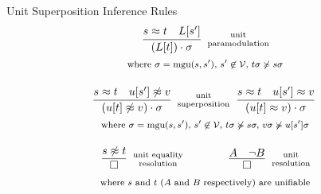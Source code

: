 
     \begin{exampleblock}{Unit Superposition Inference Rules}
\begin{gather*}
	\infer
	[\TOPTEXT{unit}{paramodulation}]
	{(L[t])\cdot\sigma}
	{s\foEQ t&L[s']}
\\\text{\footnotesize 
where $\sigma=\mgu(s,s')$,
$s'\not\in\mcV$,
$t\sigma\not\succcurlyeq s\sigma$
}\\[1em]
%
	\infer
	[\TOPTEXT{unit}{superposition}]
	{(u[t]\foNEQ v)\cdot\sigma}
	{s\foEQ t&u[s']\foNEQ v}
	\hspace{2mm}
	\infer
	[]
	{(u[t]\foEQ v)\cdot\sigma}
	{s\foEQ t&u[s']\foEQ v}
\\\text{\footnotesize 
where $\sigma=\mgu(s,s')$,
$s'\not\in\mathcal{V},$
$t\sigma\not\succcurlyeq s\sigma,$
$v\sigma\not\succcurlyeq u[s']\sigma$
}\\[1em]
%
	\infer
	[\TOPTEXT{unit equality}{resolution}]
	{\emptyclause}
	{s\foNEQ t}
	\hspace{4em}
	\infer
	[\TOPTEXT{unit}{resolution}]
	{\emptyclause}
	{A&\lnot B}\\
\text{\footnotesize 
where $s$ and $t$ ($A$ and $B$ respectively) are unifiable
}
\end{gather*}

\end{exampleblock}